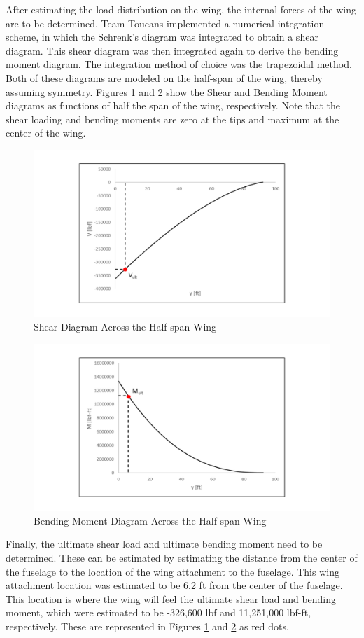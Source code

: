 After estimating the load distribution on the wing, the internal forces of the wing are to be determined. Team Toucans implemented a numerical integration scheme, in which the Schrenk's diagram was integrated to obtain a shear diagram. This shear diagram was then integrated again to derive the bending moment diagram. The integration method of choice was the trapezoidal method. Both of these diagrams are modeled on the half-span of the wing, thereby assuming symmetry. Figures \ref{sheardiag} and \ref{momentdiag} show the Shear and Bending Moment diagrams as functions of half the span of the wing, respectively. Note that the shear loading and bending moments are zero at the tips and maximum at the center of the wing. 

\begin{figure}[H]
    \centering
    \includegraphics[width=1.0\linewidth]{Photos/Shear.pdf}
    \caption{Shear Diagram Across the Half-span Wing}
    \label{sheardiag}
\end{figure}

\begin{figure}[H]
    \centering
    \includegraphics[width=1.0\linewidth]{Photos/Moment.pdf}
    \caption{Bending Moment Diagram Across the Half-span Wing}
    \label{momentdiag}
\end{figure}
\clearpage
Finally, the ultimate shear load and ultimate bending moment need to be determined. These can be estimated by estimating the distance from the center of the fuselage to the location of the wing attachment to the fuselage. This wing attachment location was estimated to be 6.2 ft from the center of the fuselage. This location is where the wing will feel the ultimate shear load and bending moment, which were estimated to be -326,600 lbf and 11,251,000 lbf-ft, respectively. These are represented in Figures \ref{sheardiag} and \ref{momentdiag} as red dots. 

